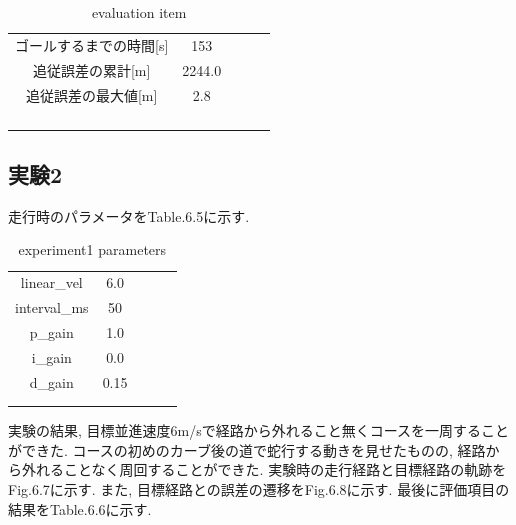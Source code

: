 \begin{table}[H]
     \centering
     \caption{evaluation item}
     \begin{tabular}{cclll}
     \multicolumn{1}{c|}{ゴールするまでの時間{[}s{]}}           & 153   &  &  &  \\
     \multicolumn{1}{c|}{追従誤差の累計{[}m{]}} & 2244.0 &  &  &  \\
     \multicolumn{1}{c|}{追従誤差の最大値{[}m{]}} & 2.8 &  &  &  \\
                                                &      &  &  &  \\
                                                &      &  &  &  \\
     \multicolumn{1}{l}{}                       &      &  &  &  \\
     \multicolumn{1}{l}{}                       &      &  &  & 
     \end{tabular}
\end{table}

\subsection{実験2}
走行時のパラメータをTable.6.5に示す.

\begin{table}[H]
     \centering
     \caption{experiment1 parameters}
     \begin{tabular}{cclll}
     \multicolumn{1}{c|}{linear\_vel}     & 6.0  &  &  &  \\
     \multicolumn{1}{c|}{interval\_ms}    & 50   &  &  &  \\
     \multicolumn{1}{c|}{p\_gain}          & 1.0  &  &  &  \\
     \multicolumn{1}{c|}{i\_gain}          & 0.0  &  &  &  \\
     \multicolumn{1}{c|}{d\_gain}          & 0.15 &  &  &  \\
     \multicolumn{1}{l}{}                 &      &  &  &  \\
     \multicolumn{1}{l}{}                 &      &  &  & 
     \end{tabular}
\end{table}

実験の結果, 目標並進速度6m/sで経路から外れること無くコースを一周することができた.
コースの初めのカーブ後の道で蛇行する動きを見せたものの, 経路から外れることなく周回することができた.
実験時の走行経路と目標経路の軌跡をFig.6.7に示す.
また, 目標経路との誤差の遷移をFig.6.8に示す.
最後に評価項目の結果をTable.6.6に示す.

